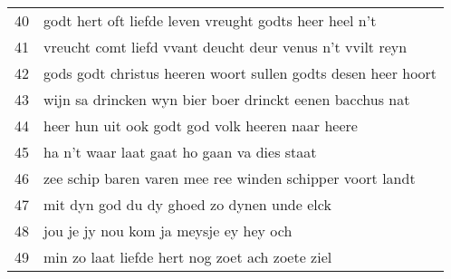 \begin{longtable}{p{} | p{}}
	40    & godt hert oft liefde leven vreught godts heer heel n't               \\
	41    & vreucht comt liefd vvant deucht deur venus n't vvilt reyn            \\
	42    & gods godt christus heeren woort sullen godts desen heer hoort        \\
	43    & wijn sa drincken wyn bier boer drinckt eenen bacchus nat             \\
	44    & heer hun uit ook godt god volk heeren naar heere                     \\
	45    & ha n't waar laat gaat ho gaan va dies staat                          \\
	46    & zee schip baren varen mee ree winden schipper voort landt            \\
	47    & mit dyn god du dy ghoed zo dynen unde elck                           \\
	48    & jou je jy nou kom ja meysje ey hey och                               \\
	49    & min zo laat liefde hert nog zoet ach zoete ziel     \\
	\bottomrule      
\end{longtable}
              
